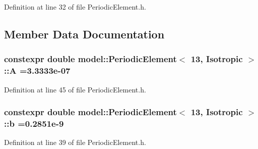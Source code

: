 Definition at line 32 of file Periodic\+Element.\+h.



\subsection{Member Data Documentation}
\hypertarget{structmodel_1_1_periodic_element_3_0113_00_01_isotropic_01_4_a9fc1cbf8f50659ed09f138cae9070f36}{}
\subsubsection[{A}]{\setlength{\rightskip}{0pt plus 5cm}constexpr double {\bf model\+::\+Periodic\+Element}$<$ 13, {\bf Isotropic} $>$\+::A =3.\+3333e-\/07\hspace{0.3cm}{\ttfamily [static]}}\label{structmodel_1_1_periodic_element_3_0113_00_01_isotropic_01_4_a9fc1cbf8f50659ed09f138cae9070f36}


Definition at line 45 of file Periodic\+Element.\+h.

\hypertarget{structmodel_1_1_periodic_element_3_0113_00_01_isotropic_01_4_ac0ba46b421731f53024a2d0bdfb8d823}{}
\subsubsection[{b}]{\setlength{\rightskip}{0pt plus 5cm}constexpr double {\bf model\+::\+Periodic\+Element}$<$ 13, {\bf Isotropic} $>$\+::b =0.\+2851e-\/9\hspace{0.3cm}{\ttfamily [static]}}\label{structmodel_1_1_periodic_element_3_0113_00_01_isotropic_01_4_ac0ba46b421731f53024a2d0bdfb8d823}


Definition at line 39 of file Periodic\+Element.\+h.

\hypertarget{structmodel_1_1_periodic_element_3_0113_00_01_isotropic_01_4_a90e4f24781a40aacc68fd794232a841e}{}
